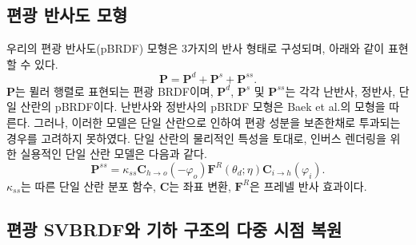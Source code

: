 \documentclass[a4paper,twocolumn]{article}
\begin{document}
\subsection{편광 반사도 모형}
\label{subsec:model}
우리의 편광 반사도(pBRDF) 모형은 3가지의 반사 형태로 구성되며, 아래와 같이 표현할 수 있다.
\begin{equation}
	\label{eq:diffuse_and_specular}
	\mathbf{P}={{\mathbf{P}}^{d}}+{{\mathbf{P}}^{s}}+{{\mathbf{P}}^{ss}}.
\end{equation}
${\mathbf{P}}$는 뮐러 행렬로 표현되는 편광 BRDF이며,  ${\mathbf{P}}^{d}$, ${\mathbf{P}}^{s}$ 및 ${\mathbf{P}}^{ss}$는 각각 난반사, 정반사, 단일 산란의 pBRDF이다.
난반사와 정반사의 pBRDF 모형은 Baek et al.\cite{Baek2018}의 모형을 따른다.
그러나, 이러한 모델은 단일 산란으로 인하여 편광 성분을 보존한채로 투과되는 경우를 고려하지 못하였다. 
단일 산란의 물리적인 특성을 토대로, 인버스 렌더링을 위한 실용적인 단일 산란 모델은 다음과 같다. 
\begin{equation}
	\label{eq:single_scattering_transport}
	{{\mathbf{P}}^{ss}}= {{\kappa}_{ss}} {{\mathbf{C}}_{h\to o}}\left(-{\varphi_{o}} \right){{\mathbf{F}}^{R}}\left( {{\theta }_{d}};\eta  \right){{\mathbf{C}}_{i\to h}}\left({\varphi_{i}} \right).
\end{equation}
%
$\kappa_{ss}$는 따른 단일 산란 분포 함수, $\mathbf{C}$는 좌표 변환, $\mathbf{F}^{R}$은 프레넬 반사 효과이다.


\subsection{편광 SVBRDF와 기하 구조의 다중 시점 복원}
\label{subsec:reconstruction}
\end{document}

